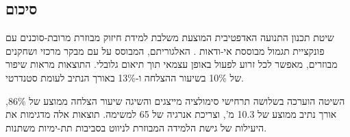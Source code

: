 \subsection{סיכום}
\label{sec:ch06_summary}

שיטת תכנון התנועה האדפטיבית המוצעת משלבת למידת חיזוק מבוזרת מרובת-סוכנים עם פונקציית תגמול מבוססת אי-ודאות . האלגוריתם, המבוסס על  עם מבקר מרכזי ושחקנים מבוזרים, מאפשר לכל זרוע לפעול באופן עצמאי תוך תיאום גלובלי. התוצאות מראות שיפור של 10\% בשיעור ההצלחה ו-13\% באורך הנתיב לעומת  סטנדרטי.

השיטה הוערכה בשלושה תרחישי סימולציה מייצגים והשיגה שיעור הצלחה ממוצע של 86\%, אורך נתיב ממוצע של 10.3 מ', וצריכת אנרגיה של 65  למשימה. תוצאות אלה מדגימות את היעילות של גישת הלמידה המבוזרת לניווט בסביבות תת-ימיות משתנות.

\cite{Chaplot2020, Boyd2011, Thrun2005, Schulman2017, Lowe2017, Fox2006}

